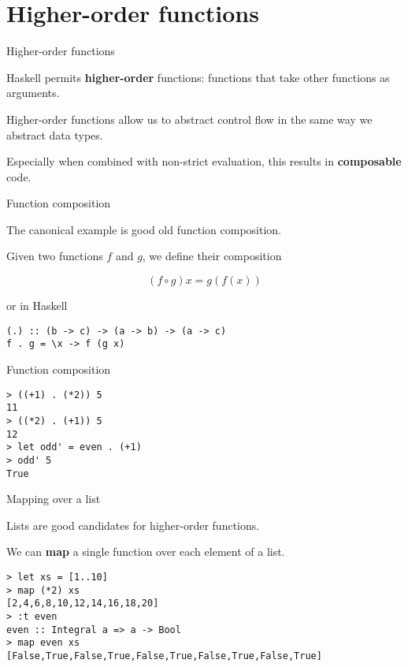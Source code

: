 
\section{Higher-order functions}

%
\begin{frame}[fragile]{Higher-order functions}

Haskell permits \textbf{higher-order} functions: functions that take other
functions as arguments.

Higher-order functions allow us to abstract control flow in the same way we
abstract data types.

Especially when combined with non-strict evaluation, this results in
\textbf{composable} code.

\end{frame}

%
\begin{frame}[fragile]{Function composition}

The canonical example is good old function composition.

Given two functions $f$ and $g$, we define their composition 

\[
(f \circ g) x = g(f(x))
\]

or in Haskell

\begin{block}{}
\begin{verbatim}
(.) :: (b -> c) -> (a -> b) -> (a -> c)
f . g = \x -> f (g x)
\end{verbatim}
\end{block}

\end{frame}

%
\begin{frame}[fragile]{Function composition}

\begin{block}{}
\begin{verbatim}
> ((+1) . (*2)) 5
11
> ((*2) . (+1)) 5
12
> let odd' = even . (+1)
> odd' 5
True
\end{verbatim}
\end{block}

\end{frame}

%
\begin{frame}[fragile]{Mapping over a list}

Lists are good candidates for higher-order functions.

We can \textbf{map} a single function over each element of a list.

\begin{block}{}
\begin{verbatim}
> let xs = [1..10]
> map (*2) xs
[2,4,6,8,10,12,14,16,18,20]
> :t even
even :: Integral a => a -> Bool
> map even xs
[False,True,False,True,False,True,False,True,False,True]
\end{verbatim}
\end{block}

\end{frame}

